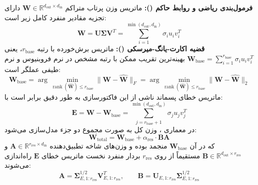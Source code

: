 \textbf{فرمول‌بندی ریاضی و روابط حاکم ():}
ماتریس وزن پرتاب متراکم $\mathbf{W} \in \mathbb{R}^{d_{\text{out}} \times d_{\text{in}}}$ دارای تجزیه مقادیر منفرد کامل زیر است:
\begin{equation}
\mathbf{W} = \mathbf{U} \mathbf{\Sigma} \mathbf{V}^T = \sum_{i=1}^{\min(d_{\text{out}}, d_{\text{in}})} \sigma_i u_i v_i^T
\end{equation}
\textbf{قضیه اکارت-یانگ-میرسکی ():} ماتریس برش‌خورده با رتبه $r_{\text{base}}$، یعنی $\mathbf{W}_{\text{base}} = \sum_{i=1}^{r_{\text{base}}} \sigma_i u_i v_i^T$ بهینه‌ترین تقریب ممکن با رتبه مشخص در نرم فروبنیوس و نرم طیفی عملگر است:
\begin{equation}
\mathbf{W}_{\text{base}} = \arg\min_{\operatorname{rank}(\hat{\mathbf{W}}) \le r_{\text{base}}} \|\mathbf{W} - \hat{\mathbf{W}}\|_F = \arg\min_{\operatorname{rank}(\hat{\mathbf{W}}) \le r_{\text{base}}} \|\mathbf{W} - \hat{\mathbf{W}}\|_2
\end{equation}
ماتریس خطای پسماند ناشی از این فاکتورسازی به طور دقیق برابر است با:
\begin{equation}
\mathbf{E} = \mathbf{W} - \mathbf{W}_{\text{base}} = \sum_{j=r_{\text{base}}+1}^{\min(d_{\text{out}}, d_{\text{in}})} \sigma_j u_j v_j^T
\end{equation}
در معماری ، وزن کل به صورت مجموع دو جزء مدل‌سازی می‌شود:
\begin{equation}
\mathbf{W}_{\text{total}} = \mathbf{W}_{\text{base}} + \alpha_{\text{res}} \cdot \mathbf{B} \mathbf{A}
\end{equation}
که در آن $\mathbf{W}_{\text{base}}$ منجمد بوده و وزن‌های شاخه تطبیق‌دهنده $\mathbf{A} \in \mathbb{R}^{r_{\text{res}} \times d_{\text{in}}}$ و $\mathbf{B} \in \mathbb{R}^{d_{\text{out}} \times r_{\text{res}}}$ مستقیماً از روی $r_{\text{res}}$ بردار منفرد نخست ماتریس خطای $\mathbf{E}$ راه‌اندازی می‌شوند:
\begin{equation}
\mathbf{A} = \mathbf{\Sigma}_{E, 1:r_{\text{res}}}^{1/2} \mathbf{V}_{E, 1:r_{\text{res}}}^T, \qquad \mathbf{B} = \mathbf{U}_{E, 1:r_{\text{res}}} \mathbf{\Sigma}_{E, 1:r_{\text{res}}}^{1/2}
\end{equation}

